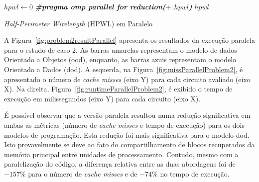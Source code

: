 \begin{algorithm}[h!t]
	\LinesNumbered
    $hpwl \gets 0$\; \label{alg:problem2paralelo:var:inithpwl}
  	\textit{\textbf{\#pragma omp parallel for reduction(}}$+:hpwl$\textit{\textbf{)}} \hspace{20pt}  \label{alg:problem2paralelo:var:endForNets}
  	\Return $hpwl$\; \label{alg:problem2paralelo:var:retorno}
	\caption{\textit{Half-Perimeter Wirelength} (HPWL) em Paralelo} 
	\label{alg:problem2paralelo}
\end{algorithm}

A Figura~\ref{fig:problem2resultParallel} apresenta os resultados da execução paralela para o estudo de caso 2.
As barras amarelas representam o modelo de dados Orientado a Objetos (\ac{ood}), enquanto, as barras azuis representam o modelo Orientado a Dados (\ac{dod}).
A esquerda, na Figura~\ref{fig:missParallelProblem2}, é apresentado o número de  \textit{cache misses} (eixo Y) para cada circuito avaliado (eixo X).
Na direita, Figura~\ref{fig:runtimeParallelProblem2}, é exibido o tempo de execução em milissegundos (eixo Y) para cada circuito (eixo X).

É possível observar que a versão paralela resultou numa redução significativa em ambas as métricas (número de  \textit{cache misses} e tempo de execução) para os dois modelos de programação. Esta redução foi mais significativa para o modelo \ac{dod}. Isto provavelmente se deve ao fato do compartilhamento de blocos recuperados da memória principal entre unidades de processamento. Contudo, mesmo com a paralelização do código, a diferença relativa entre as duas abordagens foi de $-157\%$ para o número de  \textit{cache misses} e de $-74\%$ no tempo de execução.

